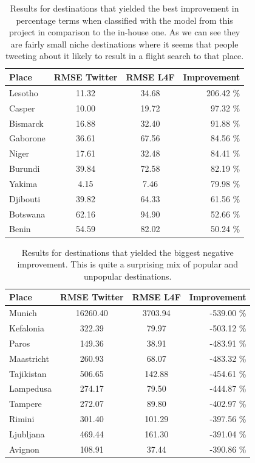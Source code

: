 \documentclass[minf,frontabs,twoside,singlespacing,parskip]{infthesis}
\begin{document}
\begin{table}[h]
\begin{center}
\begin{tabular}{ l | c | c | r}
Place & RMSE Twitter & RMSE L4F & Improvement \\
\hline
Lesotho & 11.32 & 34.68 & 206.42 \% \\ 
Casper & 10.00 & 19.72 & 97.32 \% \\ 
Bismarck & 16.88 & 32.40 & 91.88 \% \\ 
Gaborone & 36.61 & 67.56 & 84.56 \% \\ 
Niger & 17.61 & 32.48 & 84.41 \% \\ 
Burundi & 39.84 & 72.58 & 82.19 \% \\ 
Yakima & 4.15 & 7.46 & 79.98 \% \\ 
Djibouti & 39.82 & 64.33 & 61.56 \% \\ 
Botswana & 62.16 & 94.90 & 52.66 \% \\ 
Benin & 54.59 & 82.02 & 50.24 \% \\ 
\end{tabular}
\end{center}
\caption{Results for destinations that yielded the best improvement in percentage terms when classified with the model from this project in comparison to the in-house one. As we can see they are fairly small niche destinations where it seems that people tweeting about it likely to result in a flight search to that place.}
\end{table}

\begin{table}[h]
\begin{center}
\begin{tabular}{ l | c | c | r}
Place & RMSE Twitter & RMSE L4F & Improvement \\
\hline
Munich & 16260.40 & 3703.94 & -539.00 \% \\
Kefalonia & 322.39 & 79.97 & -503.12 \% \\
Paros & 149.36 & 38.91 & -483.91 \% \\
Maastricht & 260.93 & 68.07 & -483.32 \% \\
Tajikistan & 506.65 & 142.88 & -454.61 \% \\
Lampedusa & 274.17 & 79.50 & -444.87 \% \\
Tampere & 272.07 & 89.80 & -402.97 \% \\
Rimini & 301.40 & 101.29 & -397.56 \% \\
Ljubljana & 469.44 & 161.30 & -391.04 \% \\
Avignon & 108.91 & 37.44 & -390.86 \% \\
\end{tabular}
\end{center}
\caption{Results for destinations that yielded the biggest negative improvement. This is quite a surprising mix of popular and unpopular destinations. }
\end{table}
\end{document}
